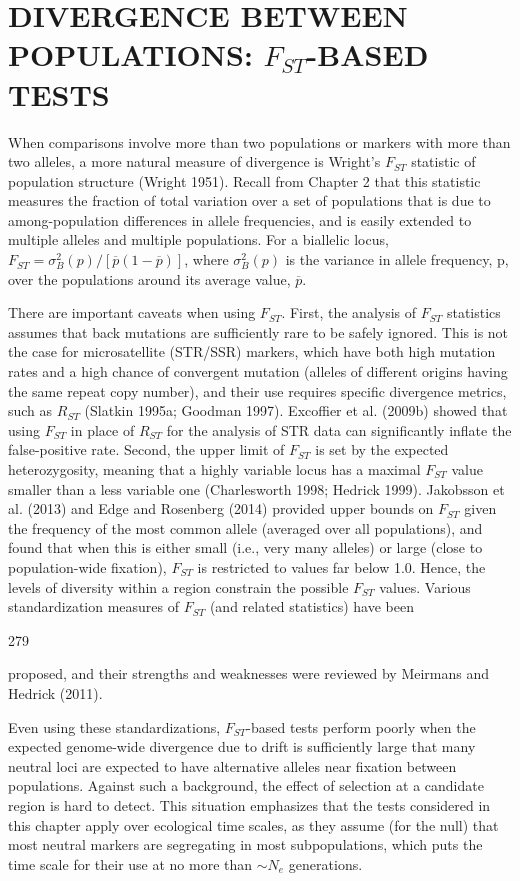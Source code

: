 \documentclass{article}
\begin{document}
\section{DIVERGENCE BETWEEN POPULATIONS:  $ F_{ST} $-BASED TESTS}
When comparisons involve more than two populations or markers with more than two alleles, a more natural measure of divergence is Wright's  $ F_{ST} $ statistic of population structure (Wright 1951). Recall from Chapter 2 that this statistic measures the fraction of total variation over a set of populations that is due to among-population differences in allele frequencies, and is easily extended to multiple alleles and multiple populations. For a biallelic locus,  $ F_{ST} = \sigma_B^2(p)/[\overline{p}(1-\overline{p})] $, where  $ \sigma_B^2(p) $ is the variance in allele frequency, p, over the populations around its average value,  $ \overline{p} $.

There are important caveats when using  $ F_{ST} $. First, the analysis of  $ F_{ST} $ statistics assumes that back mutations are sufficiently rare to be safely ignored. This is not the case for microsatellite (STR/SSR) markers, which have both high mutation rates and a high chance of convergent mutation (alleles of different origins having the same repeat copy number), and their use requires specific divergence metrics, such as  $ R_{ST} $ (Slatkin 1995a; Goodman 1997). Excoffier et al. (2009b) showed that using  $ F_{ST} $ in place of  $ R_{ST} $ for the analysis of STR data can significantly inflate the false-positive rate. Second, the upper limit of  $ F_{ST} $ is set by the expected heterozygosity, meaning that a highly variable locus has a maximal  $ F_{ST} $ value smaller than a less variable one (Charlesworth 1998; Hedrick 1999). Jakobsson et al. (2013) and Edge and Rosenberg (2014) provided upper bounds on  $ F_{ST} $ given the frequency of the most common allele (averaged over all populations), and found that when this is either small (i.e., very many alleles) or large (close to population-wide fixation),  $ F_{ST} $ is restricted to values far below 1.0. Hence, the levels of diversity within a region constrain the possible  $ F_{ST} $ values. Various standardization measures of  $ F_{ST} $ (and related statistics) have been

279

proposed, and their strengths and weaknesses were reviewed by Meirmans and Hedrick (2011).

Even using these standardizations,  $ F_{ST} $-based tests perform poorly when the expected genome-wide divergence due to drift is sufficiently large that many neutral loci are expected to have alternative alleles near fixation between populations. Against such a background, the effect of selection at a candidate region is hard to detect. This situation emphasizes that the tests considered in this chapter apply over ecological time scales, as they assume (for the null) that most neutral markers are segregating in most subpopulations, which puts the time scale for their use at no more than  $ \sim N_{e} $ generations.
\end{document}
